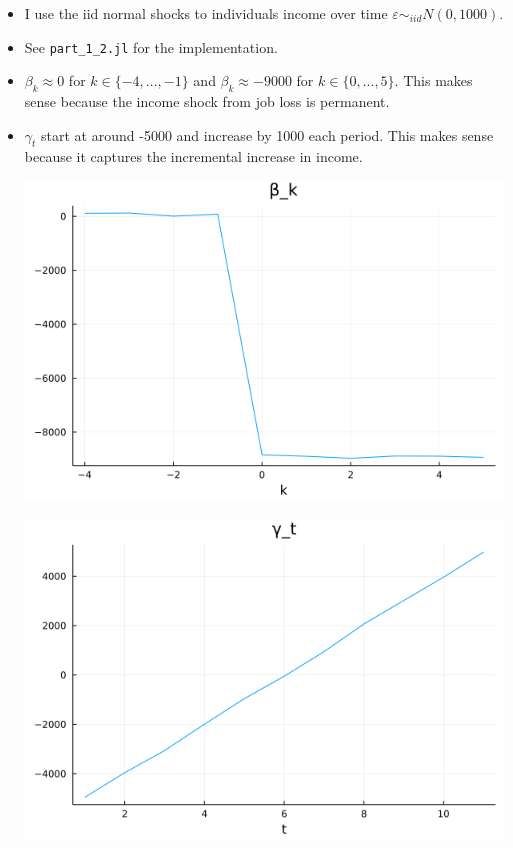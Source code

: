 \documentclass{article}
\begin{document}
\begin{itemize}
\item I use the iid normal shocks to individuals income over time $\varepsilon \sim_{iid} N(0, 1000)$.

\item See \texttt{part\_1\_2.jl} for the implementation.

\item $\beta_k \approx 0$ for $k \in \{-4,..., -1\}$ and $\beta_k \approx -9000$ for $k \in \{0,..., 5\}$.  This makes sense because the income shock from job loss is permanent.

\item $\gamma_t$ start at around -5000 and increase by 1000 each period. This makes sense because it captures the incremental increase in income.



\includegraphics[scale=0.5]{part_1_2_beta}

\includegraphics[scale=0.5]{part_1_2_gamma}


\end{itemize}
\end{document}
